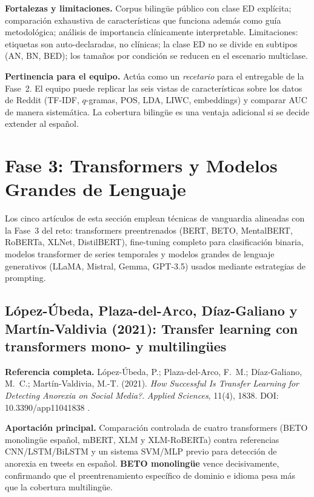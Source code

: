 \documentclass[journal]{IEEEtran}
\begin{document}
\textbf{Fortalezas y limitaciones.} Corpus bilingüe público con clase ED explícita; comparación exhaustiva de características que funciona además como guía metodológica; análisis de importancia clínicamente interpretable. Limitaciones: etiquetas son auto-declaradas, no clínicas; la clase ED no se divide en subtipos (AN, BN, BED); los tamaños por condición se reducen en el escenario multiclase.

\textbf{Pertinencia para el equipo.} Actúa como un \emph{recetario} para el entregable de la Fase~2. El equipo puede replicar las seis vistas de características sobre los datos de Reddit (TF-IDF, $q$-gramas, POS, LDA, LIWC, embeddings) y comparar AUC de manera sistemática. La cobertura bilingüe es una ventaja adicional si se decide extender al español.

\section{Fase 3: Transformers y Modelos Grandes de Lenguaje}

Los cinco artículos de esta sección emplean técnicas de vanguardia alineadas con la Fase~3 del reto: transformers preentrenados (BERT, BETO, MentalBERT, RoBERTa, XLNet, DistilBERT), fine-tuning completo para clasificación binaria, modelos transformer de series temporales y modelos grandes de lenguaje generativos (LLaMA, Mistral, Gemma, GPT-3.5) usados mediante estrategias de prompting.

\subsection{López-Úbeda, Plaza-del-Arco, Díaz-Galiano y Martín-Valdivia (2021): Transfer learning con transformers mono- y multilingües}

\textbf{Referencia completa.} López-Úbeda, P.; Plaza-del-Arco, F.~M.; Díaz-Galiano, M.~C.; Martín-Valdivia, M.-T. (2021). \emph{How Successful Is Transfer Learning for Detecting Anorexia on Social Media?}. \textit{Applied Sciences}, 11(4), 1838. DOI: 10.3390/app11041838 \cite{lopezubeda2021transfer}.

\textbf{Aportación principal.} Comparación controlada de cuatro transformers (BETO monolingüe español, mBERT, XLM y XLM-RoBERTa) contra referencias CNN/LSTM/BiLSTM y un sistema SVM/MLP previo para detección de anorexia en tweets en español. \textbf{BETO monolingüe} vence decisivamente, confirmando que el preentrenamiento específico de dominio e idioma pesa más que la cobertura multilingüe.
\end{document}
